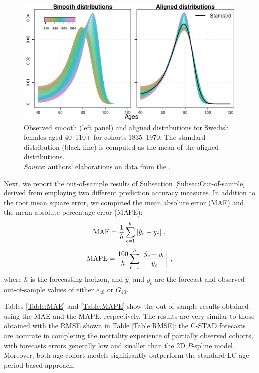 \documentclass[11pt, a4paper]{article}
\begin{document}
\begin{figure}[t]
	\begin{center}
		\includegraphics[scale=0.57]{./Figures/FA0.pdf}
		\caption{Observed smooth (left panel) and aligned distributions for Swedish females aged 40--110+ for cohorts 1835--1970. The standard distribution (black line) is computed as the mean of the aligned distributions. \\ \small \textit{Source}: authors' elaborations on data from the \cite{HMD}.}\label{Fig:Alignment}	
	\end{center}
\end{figure}

Next, we report the out-of-sample results of Subsection \ref{Subsec:Out-of-sample} derived from employing two different prediction accuracy measures. In addition to the root mean square error, we computed the mean absolute error (MAE) and the mean absolute percentage error (MAPE):
%
\begin{equation}\label{Eq:MAE}
\mathrm{MAE} = \frac{1}{h} \sum_{c=1}^{h} \left| \hat{y}_c - y_c \right|  \, , \notag 
\end{equation} 
%
\begin{equation}\label{Eq:MAPE}
\mathrm{MAPE}= \frac{100}{h}  \sum_{c=1}^{h} \left| \frac{\hat{y}_c - y_c}{y_c}  \right| \, , \notag
\end{equation} 
%
where $h$ is the forecasting horizon, and $\hat{y}_c$ and $y_c$ are the forecast and observed out-of-sample values of either $e_{40}$ or $G_{40}$. 

Tables \ref{Table:MAE} and \ref{Table:MAPE} show the out-of-sample results obtained using the MAE and the MAPE, respectively. The results are very similar to those obtained with the RMSE shown in Table \ref{Table:RMSE}: the C-STAD forecasts are accurate in completing the mortality experience of partially observed cohorts, with forecasts errors generally low and smaller than the 2D $P$-spline model. Moreover, both age-cohort models significantly outperform the standard LC age-period based approach.
  
\end{document}

